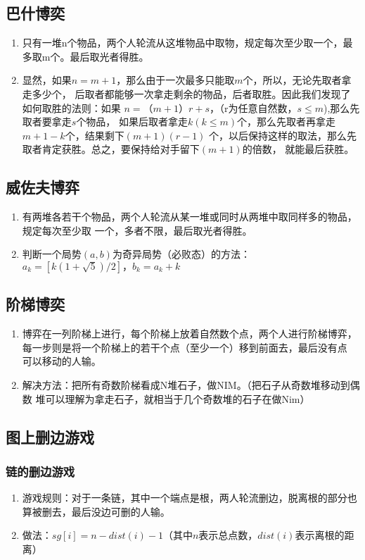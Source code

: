 \subsection*{巴什博奕}
	\begin{enumerate}
		\item
			只有一堆n个物品，两个人轮流从这堆物品中取物，规定每次至少取一个，最多取m个。最后取光者得胜。
		\item
			显然，如果$n=m+1$，那么由于一次最多只能取$m$个，所以，无论先取者拿走多少个，
			后取者都能够一次拿走剩余的物品，后者取胜。因此我们发现了如何取胜的法则：如果
			$n=（m+1）r+s$，（r为任意自然数，$s \leq m$),那么先取者要拿走$s$个物品，
			如果后取者拿走$k(k \leq m)$个，那么先取者再拿走$m+1-k$个，结果剩下$(m+1)(r-1)$
			个，以后保持这样的取法，那么先取者肯定获胜。总之，要保持给对手留下$(m+1)$的倍数，
			就能最后获胜。
	\end{enumerate}
\subsection*{威佐夫博弈}
	\begin{enumerate}
		\item
			有两堆各若干个物品，两个人轮流从某一堆或同时从两堆中取同样多的物品，规定每次至少取
			一个，多者不限，最后取光者得胜。
		\item
			判断一个局势$(a, b)$为奇异局势（必败态）的方法：$\displaystyle a_k =[k (1+\sqrt{5})/2]，b_k= a_k + k$
	\end{enumerate}
\subsection*{阶梯博奕}
	\begin{enumerate}
		\item
			博弈在一列阶梯上进行，每个阶梯上放着自然数个点，两个人进行阶梯博弈，
			每一步则是将一个阶梯上的若干个点（至少一个）移到前面去，最后没有点
			可以移动的人输。
		\item
			解决方法：把所有奇数阶梯看成N堆石子，做NIM。（把石子从奇数堆移动到偶数
			堆可以理解为拿走石子，就相当于几个奇数堆的石子在做Nim）
	\end{enumerate}
\subsection*{图上删边游戏}
	\subsubsection*{链的删边游戏}
		\begin{enumerate}
			\item
				游戏规则：对于一条链，其中一个端点是根，两人轮流删边，脱离根的部分也算被删去，最后没边可删的人输。
			\item
				做法：$sg[i] = n - dist(i) - 1$（其中$n$表示总点数，$dist(i)$表示离根的距离）
		\end{enumerate}
